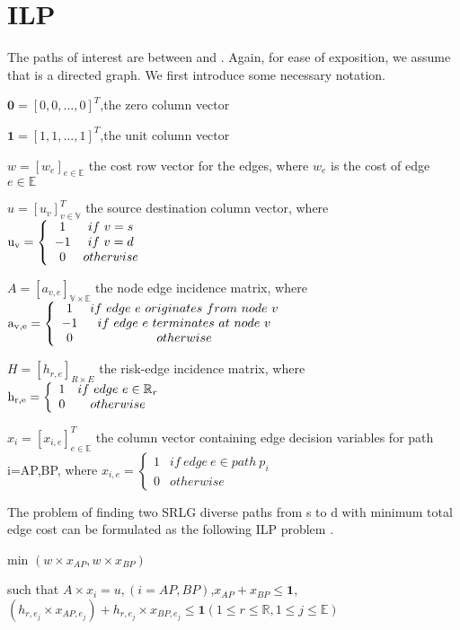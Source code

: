 \section{ILP}
The paths of interest are between and . Again, for ease of exposition, we assume that is a directed graph.
We first introduce some necessary notation.

$\textbf{0}=[0,0,\ldots,0]^T$,the zero column vector

$\textbf{1}=[1,1,\ldots,1]^T$,the unit column vector


$w=[w_e]_{e\in \mathbb{E}}$ the cost row vector for the edges, where $w_e$ is
the cost of edge $e\in \mathbb{E}$

$u=[u_v]^T_{v\in \mathbb{V}}$ the source destination column vector, where
${\rm{u_v}} = \left\{ {\begin{array}{*{20}{c}}
1&{if\ v = s}\\
{ - 1}&{if\ v = d}\\
0&{otherwise}
\end{array}} \right.$

$A=[a_{v,e}]_{\mathbb{V}\times \mathbb{E}}$ the node edge incidence matrix, where ${\rm{a_{v,e}}} = \left\{ {\begin{array}{*{20}{c}}
1&{if\ edge\ e\ originates\ from\ node\ v}\\
{ - 1}&{if\ edge\ e\ terminates\ at\ node\ v}\\
0&{otherwise}
\end{array}} \right.$

$H=[h_{r,e}]_{R\times E}$ the risk-edge incidence matrix, where ${\rm{h_{r,e}}} = \left\{ {\begin{array}{*{20}{c}}
1&{if\ edge\ e \in \mathbb{R}_r}\\
0&{otherwise}
\end{array}} \right.$

$x_i=[x_{i,e}]^T_{e\in \mathbb{E}}$ the column vector containing edge decision variables for path i=AP,BP, where
${x_{i,e}} = \left\{ {\begin{array}{*{20}{c}}
1&{if\ edge\ e \in path\ p_i}\\
0&{otherwise}
\end{array}} \right.$


The problem of finding two SRLG diverse paths from s to d with minimum total edge cost can be formulated as the following ILP problem .

min $(w\times x_{AP},w\times x_{BP})$

such that $A\times x_i=u,(i=AP,BP)$,$x_{AP}+x_{BP}\leq \textbf{1}$, $(h_{r,e_j}\times x_{AP,e_j})+h_{r,e_j}\times x_{BP,e_j} \leq \textbf{1}(1\leq r \leq \mathbb{R},1\leq j \leq \mathbb{E})$

